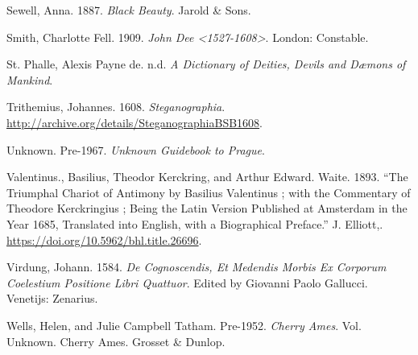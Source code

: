 \documentclass[
]{article}
\newlength{\cslhangindent}
\newenvironment{CSLReferences}[2] %
 {\begin{list}{}{%
  \setlength{\itemindent}{0pt}
  \setlength{\leftmargin}{0pt}
  \setlength{\parsep}{0pt}
  \ifodd #1
   \setlength{\leftmargin}{\cslhangindent}
   \setlength{\itemindent}{-1\cslhangindent}
  \fi
  \setlength{\itemsep}{#2\baselineskip}}}
 {\end{list}}
\begin{document}
\begin{CSLReferences}{1}{0}
Sewell, Anna. 1887. \emph{Black Beauty}. Jarold \& Sons.

Smith, Charlotte Fell. 1909. \emph{John Dee
\textless1527-1608\textgreater{}}. London: Constable.

St. Phalle, Alexis Payne de. n.d. \emph{A Dictionary of Deities, Devils
and Dæmons of Mankind}.

Trithemius, Johannes. 1608. \emph{Steganographia}.
\url{http://archive.org/details/SteganographiaBSB1608}.

Unknown. Pre-1967. \emph{Unknown Guidebook to Prague}.

Valentinus., Basilius, Theodor Kerckring, and Arthur Edward. Waite.
1893. {``The Triumphal Chariot of Antimony by Basilius Valentinus ; with
the Commentary of Theodore Kerckringius ; Being the Latin Version
Published at Amsterdam in the Year 1685, Translated into English, with a
Biographical Preface.''} J. Elliott,.
\url{https://doi.org/10.5962/bhl.title.26696}.

Virdung, Johann. 1584. \emph{De Cognoscendis, Et Medendis Morbis Ex
Corporum Coelestium Positione Libri Quattuor}. Edited by Giovanni Paolo
Gallucci. Venetijs: Zenarius.

Wells, Helen, and Julie Campbell Tatham. Pre-1952. \emph{Cherry Ames}.
Vol. Unknown. Cherry Ames. Grosset \& Dunlop.

\end{CSLReferences}
\end{document}
